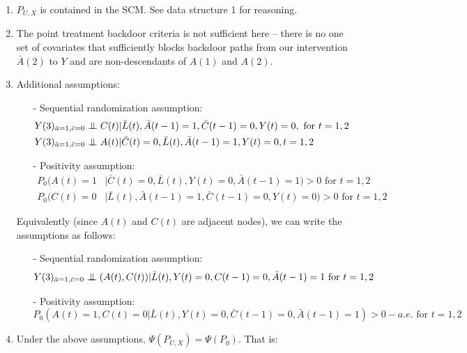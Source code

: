 \documentclass[answers]{exam}
\newcommand\independent{\protect\mathpalette{\protect\independenT}{\perp}}
\def\independenT#1#2{\mathrel{\setbox0\hbox{$#1#2$}%
    \copy0\kern-\wd0\mkern4mu\box0}}
\begin{document}
\begin{solution}
\begin{enumerate}
\item $P_{U,X}$ is contained in the SCM. See data structure 1 for reasoning.
\item The point treatment backdoor criteria is not sufficient here -- there is no one set of covariates that sufficiently blocks backdoor paths from our intervention $\bar{A}(2)$ to $Y$ and are non-descendants of $A(1)$ and $A(2)$.
\item Additional assumptions:
\begin{itemize}
\item[-] Sequential randomization assumption:
\begin{align*}
Y(3)_{\bar{a}=1, \bar{c}=0} &\independent C(t) | \bar{L}(t), \bar{A}(t-1) = 1, \bar{C}(t-1) = 0, Y(t) = 0, \text{ for } t = 1, 2 \\
Y(3)_{\bar{a}=1, \bar{c}=0} &\independent A(t) | \bar{C}(t) = 0, \bar{L}(t), \bar{A}(t-1) = 1, Y(t) = 0, t = 1, 2 
\end{align*}
\item[-] Positivity assumption:
\begin{align*}
P_0(A(t)=1 &| \bar{C}(t)=0, \bar{L}(t), Y(t) = 0, \bar{A}(t-1)=1)>0 \text{ for } t=1,2 \\
P_0(C(t) = 0 &| \bar{L}(t), \bar{A}(t-1)=1, \bar{C}(t-1) =0, Y(t)=0) > 0 \text{ for } t = 1, 2 
\end{align*}
\end{itemize}

Equivalently (since $A(t)$ and $C(t)$ are adjacent nodes), we can write the assumptions as follows:
\begin{itemize}
\item[-] Sequential randomization assumption:
\[
Y(3)_{\bar{a}=1,\bar{c}=0} \independent (A(t),C(t)) | \bar{L}(t),Y(t)=0,C(t-1)=0,\bar{A}(t-1) = 1 \text{ for } t=1,2
\]
\item[-] Positivity assumption:
\[
P_0(A(t) = 1, C(t) = 0 | \bar{L}(t), Y(t)=0, \bar{C}(t-1) = 0, \bar{A}(t-1) = 1) > 0 - a.e. \text{ for } t = 1,2
\]
\end{itemize}



\item Under the above assumptions, $\Psi(P_{U,X}) = \Psi(P_0)$. That is:


\end{enumerate}
\end{solution}
\end{document}
